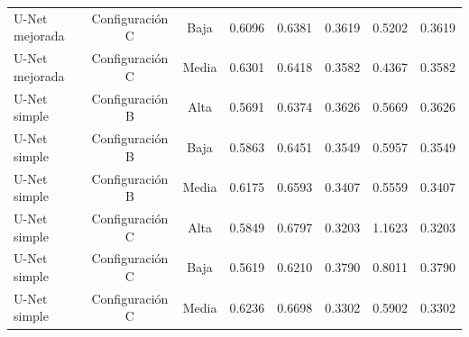 \begin{table}[H]
\begin{tabular}{lccccccc}
        U-Net mejorada & Configuración C & Baja & 0.6096 & 0.6381 & 0.3619 & 0.5202 & 0.3619 \\
        U-Net mejorada & Configuración C & Media & 0.6301 & 0.6418 & 0.3582 & 0.4367 & 0.3582 \\
        U-Net simple & Configuración B & Alta & 0.5691 & 0.6374 & 0.3626 & 0.5669 & 0.3626 \\
        U-Net simple & Configuración B & Baja & 0.5863 & 0.6451 & 0.3549 & 0.5957 & 0.3549 \\
        U-Net simple & Configuración B & Media & 0.6175 & 0.6593 & 0.3407 & 0.5559 & 0.3407 \\
        U-Net simple & Configuración C & Alta & 0.5849 & 0.6797 & 0.3203 & 1.1623 & 0.3203 \\
        U-Net simple & Configuración C & Baja & 0.5619 & 0.6210 & 0.3790 & 0.8011 & 0.3790 \\
        U-Net simple & Configuración C & Media & 0.6236 & 0.6698 & 0.3302 & 0.5902 & 0.3302 \\
        \bottomrule
    \end{tabular}
\end{table}
